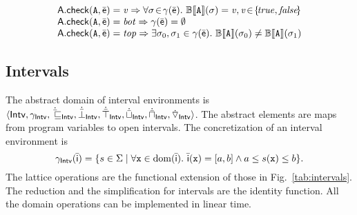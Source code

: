 \documentclass[sttt]{svjour}
\begin{document}
\vspace{-0.2cm}
\begin{small}
  \begin{equation*}
    \begin{array}{l}
      \adom{A}.\checkif(\code{A},\ael{e}) = \mathit{v} \Rightarrow  \forall \sigma \!\in\! \gamma(\ael{e}).\ \semantica{B}{\code{A}}(\sigma) = \mathit{v},  \mathit{v} \!\in\! \{\! \mathit{true}, \mathit{false}\! \} \\
      \adom{A}.\checkif(\code{A},\ael{e}) = \mathit{bot} \Rightarrow  \gamma(\ael{e}) = \emptyset \\
      \adom{A}.\checkif(\code{A},\ael{e}) = \mathit{top} \Rightarrow  \exists \sigma_0, \sigma_1 \in \gamma(\ael{e}).\   \semantica{B}{\code{A}}(\sigma_0) \neq  \semantica{B}{\code{A}}(\sigma_1)
    \end{array}
 \label{for:soundnesscheck}
\end{equation*}
\end{small}




\subsection{Intervals}
The abstract domain of interval environments is $\langle \mathsf{Intv}, \gamma_{\mathsf{Intv}},\allowbreak \dot{\bar{\sqsubseteq}}_{\mathsf{Intv}}, \dot{\bar{\bot}}_{\mathsf{Intv}}, \allowbreak \dot{\bar{\top}}_{\mathsf{Intv}}, \dot{\bar{\sqcup}}_{\mathsf{Intv}}, \dot{\bar{\sqcap}}_{\mathsf{Intv}}, \dot{\triangledown}_{\mathsf{Intv}} \rangle$.
The abstract elements are maps from program variables to open intervals. 
The concretization of an interval environment  is 
\[
\gamma_\Intervals(\ael{i}) = \{ s \in \Sigma \mid \forall \code{x} \in \mathrm{dom}(\ael{i}).\ \ael{i}(\code{x}) = [a, b] \wedge  a \leq s(\code{x}) \leq b\}.
\]
The lattice operations are the functional extension of those in Fig.~\ref{tab:intervals}.
The reduction and the simplification for intervals are the identity function.
All the domain operations can be implemented in linear time. 
\end{document}
